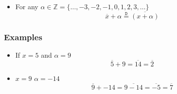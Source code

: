 \documentclass[preview]{standalone}
\begin{document}
\begin{center}
\begin{itemize}
  \item For any $\alpha \in \mathbb{Z} = \{ \dots, -3, -2, -1, 0, 1, 2, 3, \dots\}$
	\[
	\overline{x}  +  \alpha \stackrel{\mathtt{D}}{=} \overline{\left( x  +  \alpha \right)}
	\]
\end{itemize}
\subsubsection*{Examples}
\begin{itemize}
  \item If $x = 5$ and $\alpha = 9$
	\[
	\overline{5}  +  9 = \overline{14} = \overline{2}
	\] 
  \item $x = 9$ $\alpha = -14$ 
	\[
	\overline{9}  +   - 14 = \overline{9  -  14} = \overline{  - 5} = \overline{7}
	\]
\end{itemize}
\end{center}
\end{document}
